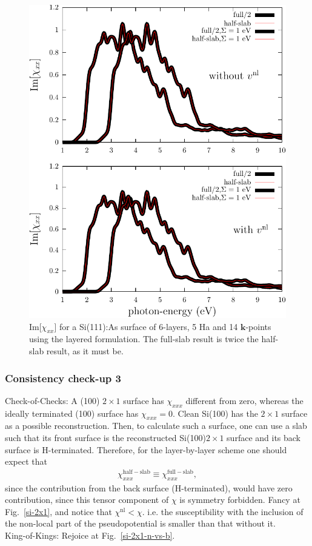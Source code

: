 \begin{figure}[b]
\centering
\includegraphics[scale=.7]{content/figures/appendices/surface-chi}
\caption{Im[$\chi_{xx}$] for a Si(111):As surface of 6-layers, 5 Ha and 14
$\mathbf{k}$-points using the layered formulation. The full-slab result is twice
the half-slab result, as it must be. }
\label{si111as}
\end{figure}

\subsubsection{Consistency check-up 3}

Check-of-Checks: 
A (100) $2\times 1$ surface has $\chi_{xxx}$
 different from zero,
whereas the ideally terminated (100) surface has $\chi_{xxx}=0$.
Clean Si(100) has the $2\times 1$ surface as a possible
reconstruction. Then, to calculate such a surface, one can use
a slab such that its front surface is the reconstructed 
Si(100)$2\times 1$ surface and its back surface is H-terminated.
Therefore,
 for the
layer-by-layer scheme one should expect that
\begin{align}\label{cc3}
\chi^{\mathrm{half-slab}}_{xxx}
\equiv
\chi^{\mathrm{full-slab}}_{xxx}
,
\end{align}
since the contribution from the back surface (H-terminated), would
have zero contribution, since this tensor component of $\chi$ is
symmetry forbidden. Fancy at
Fig.~\ref{si-2x1}, and notice that $\chi^\mathrm{nl}<\chi$. i.e. the
susceptibility with the inclusion of the non-local part of the
pseudopotential is smaller than that without it.\\
King-of-Kings: Rejoice at 
Fig.~\ref{si-2x1-n-vs-b}.

